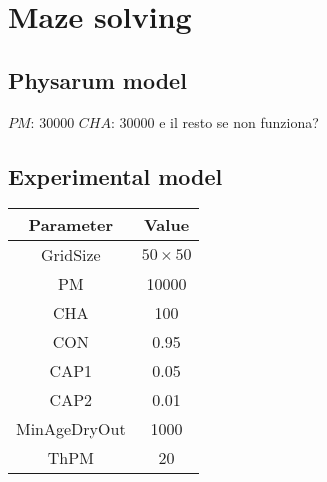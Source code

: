 \section{Maze solving}

\subsection{Physarum model}
$PM$: 30000
$CHA$: 30000
e il resto se non funziona?

\subsection{Experimental model}

\begin{center}
 \begin{tabular}{||c c||} 
 \hline
 Parameter & Value \\ [0.5ex] 
 \hline\hline
 GridSize & $50 \times 50$ \\ 
 \hline
 PM & 10000 \\ 
 \hline
 CHA & 100 \\ 
 \hline
 CON & 0.95 \\ 
 \hline
 CAP1 & 0.05 \\ 
 \hline
 CAP2 & 0.01 \\ 
 \hline
 MinAgeDryOut & 1000 \\
 \hline
 ThPM & 20 \\ [1ex] 
 \hline
 \end{tabular}
\end{center}
